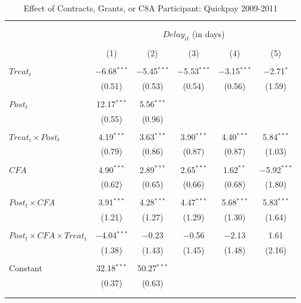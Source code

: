 \documentclass[
]{article}
\begin{document}
\begin{table}[H] \centering 
  \caption{Effect of Contracts, Grants, or C8A Participant: Quickpay 2009-2011} 
  \label{} 
\small 
\begin{tabular}{@{\extracolsep{-2pt}}lccccc} 
\\[-1.8ex]\hline 
\hline \\[-1.8ex] 
\\[-1.8ex] & \multicolumn{5}{c}{$Delay_{it}$ (in days)} \\ 
\\[-1.8ex] & (1) & (2) & (3) & (4) & (5)\\ 
\hline \\[-1.8ex] 
 $Treat_i$ & $-$6.68$^{***}$ & $-$5.45$^{***}$ & $-$5.53$^{***}$ & $-$3.15$^{***}$ & $-$2.71$^{*}$ \\ 
  & (0.51) & (0.53) & (0.54) & (0.56) & (1.59) \\ 
  & & & & & \\ 
 $Post_t$ & 12.17$^{***}$ & 5.56$^{***}$ &  &  &  \\ 
  & (0.55) & (0.96) &  &  &  \\ 
  & & & & & \\ 
 $Treat_i \times Post_t$ & 4.19$^{***}$ & 3.63$^{***}$ & 3.90$^{***}$ & 4.40$^{***}$ & 5.84$^{***}$ \\ 
  & (0.79) & (0.86) & (0.87) & (0.87) & (1.03) \\ 
  & & & & & \\ 
 $CFA$ & 4.90$^{***}$ & 2.89$^{***}$ & 2.65$^{***}$ & 1.62$^{**}$ & $-$5.92$^{***}$ \\ 
  & (0.62) & (0.65) & (0.66) & (0.68) & (1.80) \\ 
  & & & & & \\ 
 $Post_t \times CFA$ & 3.91$^{***}$ & 4.28$^{***}$ & 4.47$^{***}$ & 5.68$^{***}$ & 5.83$^{***}$ \\ 
  & (1.21) & (1.27) & (1.29) & (1.30) & (1.64) \\ 
  & & & & & \\ 
 $Post_t \times CFA \times Treat_i$ & $-$4.04$^{***}$ & $-$0.23 & $-$0.56 & $-$2.13 & 1.61 \\ 
  & (1.38) & (1.43) & (1.45) & (1.48) & (2.16) \\ 
  & & & & & \\ 
 Constant & 32.18$^{***}$ & 50.27$^{***}$ &  &  &  \\ 
  & (0.37) & (0.63) &  &  &  \\ 
  & & & & & \\ 
\hline \\[-1.8ex] 

\end{tabular}
\end{table}
\end{document}
